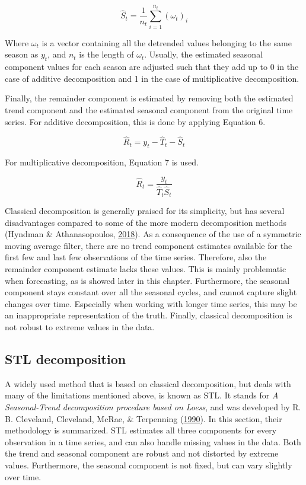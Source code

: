 \documentclass[12pt,oneside]{reedthesis}
\begin{document}
\[ \hat{S}_{t} = \frac{1}{n_{t}}\sum_{i=1}^{n_{t}}(\omega_{t})_{i} \]

Where \(\omega_{t}\) is a vector containing all the detrended values
belonging to the same season as \(y_{t}\), and \(n_{t}\) is the length
of \(\omega_{t}\). Usually, the estimated seasonal component values for
each season are adjusted such that they add up to 0 in the case of
additive decomposition and 1 in the case of multiplicative
decomposition.

Finally, the remainder component is estimated by removing both the
estimated trend component and the estimated seasonal component from the
original time series. For additive decomposition, this is done by
applying Equation 6.

\[ \hat{R}_{t} = y_{t} - \hat{T}_{t} - \hat{S}_{t} \]

For multiplicative decomposition, Equation 7 is used.

\[ \hat{R}_{t} = \frac{y_{t}}{\hat{T}_{t}\hat{S}_{t}} \]

Classical decomposition is generally praised for its simplicity, but has
several disadvantages compared to some of the more modern decomposition
methods (Hyndman \& Athanasopoulos,
\protect\hyperlink{ref-hyndman2018fpp}{2018}). As a consequence of the
use of a symmetric moving average filter, there are no trend component
estimates available for the first few and last few observations of the
time series. Therefore, also the remainder component estimate lacks
these values. This is mainly problematic when forecasting, as is showed
later in this chapter. Furthermore, the seasonal component stays
constant over all the seasonal cycles, and cannot capture slight changes
over time. Especially when working with longer time series, this may be
an inappropriate representation of the truth. Finally, classical
decomposition is not robust to extreme values in the data.

\subsection{STL decomposition}\label{stl-decomposition}

A widely used method that is based on classical decomposition, but deals
with many of the limitations mentioned above, is known as STL. It stands
for \emph{A Seasonal-Trend decomposition procedure based on Loess}, and
was developed by R. B. Cleveland, Cleveland, McRae, \& Terpenning
(\protect\hyperlink{ref-cleveland1990}{1990}). In this section, their
methodology is summarized. STL estimates all three components for every
observation in a time series, and can also handle missing values in the
data. Both the trend and seasonal component are robust and not distorted
by extreme values. Furthermore, the seasonal component is not fixed, but
can vary slightly over time.
\end{document}
